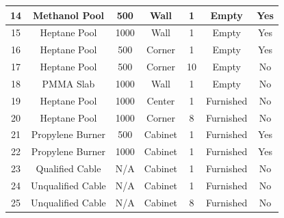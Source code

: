\begin{table}[h!]
\begin{center}
\begin{tabular}{|c|c|c|c|c|c|c|}
14      & Methanol Pool     &     500       & Wall          & 1                 & Empty                 &        Yes \\ \hline
15      & Heptane Pool      &    1000       & Wall          & 1                 & Empty                 &        Yes \\ \hline
16      & Heptane Pool      &     500       & Corner        & 1                 & Empty                 &        Yes \\ \hline
17      & Heptane Pool      &     500       & Corner        & 10                & Empty                 &         No \\ \hline
18      &  PMMA Slab        &    1000       & Wall          & 1                 & Empty                 &         No \\ \hline
19      & Heptane Pool      &    1000       & Center        & 1                 & Furnished             &         No \\ \hline
20      & Heptane Pool      &    1000       & Corner        & 8                 & Furnished             &         No \\ \hline
21      & Propylene Burner  &     500       & Cabinet       & 1                 & Furnished             &        Yes \\ \hline
22      & Propylene Burner  &    1000       & Cabinet       & 1                 & Furnished             &        Yes \\ \hline
23      & Qualified Cable   &        N/A    & Cabinet       & 1                 & Furnished             &         No \\ \hline
24      & Unqualified Cable &        N/A    & Cabinet       & 1                 & Furnished             &         No \\ \hline
25      & Unqualified Cable &        N/A    & Cabinet       & 8                 & Furnished             &         No \\ \hline
\end{tabular}
\end{center}
\label{FM_SNL_Matrix}
\end{table}



